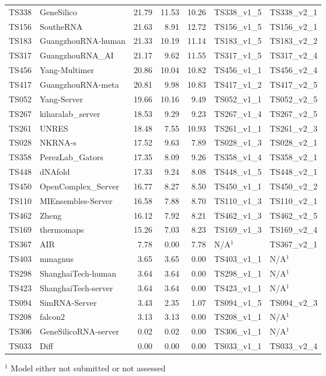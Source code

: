 \begin{table}[ht]
{\begin{tabular}{llrrrll}
TS338 & GeneSilico & 21.79 & 11.53 & 10.26 & TS338\_v1\_5 & TS338\_v2\_1 \\ 
TS156 & SoutheRNA & 21.63 & 8.91 & 12.72 & TS156\_v1\_5 & TS156\_v2\_1 \\ 
TS183 & GuangzhouRNA-human & 21.33 & 10.19 & 11.14 & TS183\_v1\_5 & TS183\_v2\_2 \\ 
TS317 & GuangzhouRNA\_AI & 21.17 & 9.62 & 11.55 & TS317\_v1\_5 & TS317\_v2\_4 \\ 
TS456 & Yang-Multimer & 20.86 & 10.04 & 10.82 & TS456\_v1\_1 & TS456\_v2\_4 \\ 
TS417 & GuangzhouRNA-meta & 20.81 & 9.98 & 10.83 & TS417\_v1\_2 & TS417\_v2\_5 \\ 
TS052 & Yang-Server & 19.66 & 10.16 & 9.49 & TS052\_v1\_1 & TS052\_v2\_5 \\ 
TS267 & kiharalab\_server & 18.53 & 9.29 & 9.23 & TS267\_v1\_4 & TS267\_v2\_5 \\ 
TS261 & UNRES & 18.48 & 7.55 & 10.93 & TS261\_v1\_1 & TS261\_v2\_3 \\ 
TS028 & NKRNA-s & 17.52 & 9.63 & 7.89 & TS028\_v1\_3 & TS028\_v2\_1 \\ 
TS358 & PerezLab\_Gators & 17.35 & 8.09 & 9.26 & TS358\_v1\_4 & TS358\_v2\_1 \\ 
TS448 & dNAfold & 17.33 & 9.24 & 8.08 & TS448\_v1\_5 & TS448\_v2\_1 \\ 
TS450 & OpenComplex\_Server & 16.77 & 8.27 & 8.50 & TS450\_v1\_1 & TS450\_v2\_2 \\ 
TS110 & MIEnsembles-Server & 16.58 & 7.88 & 8.70 & TS110\_v1\_3 & TS110\_v2\_1 \\ 
TS462 & Zheng & 16.12 & 7.92 & 8.21 & TS462\_v1\_3 & TS462\_v2\_5 \\ 
TS169 & thermomaps & 15.26 & 7.03 & 8.23 & TS169\_v1\_3 & TS169\_v2\_4 \\ 
TS367 & AIR & 7.78 & 0.00 & 7.78 & N/A$^{1}$ & TS367\_v2\_1 \\ 
TS403 & mmagnus & 3.65 & 3.65 & 0.00 & TS403\_v1\_1 & N/A$^{1}$ \\ 
TS298 & ShanghaiTech-human & 3.64 & 3.64 & 0.00 & TS298\_v1\_1 & N/A$^{1}$ \\ 
TS423 & ShanghaiTech-server & 3.64 & 3.64 & 0.00 & TS423\_v1\_1 & N/A$^{1}$ \\ 
TS094 & SimRNA-Server & 3.43 & 2.35 & 1.07 & TS094\_v1\_5 & TS094\_v2\_3 \\ 
TS208 & falcon2 & 3.13 & 3.13 & 0.00 & TS208\_v1\_1 & N/A$^{1}$ \\ 
TS306 & GeneSilicoRNA-server & 0.02 & 0.02 & 0.00 & TS306\_v1\_1 & N/A$^{1}$ \\ 
TS033 & Diff & 0.00 & 0.00 & 0.00 & TS033\_v1\_1 & TS033\_v2\_4 \\ 
\bottomrule
\end{tabular}%
}
\begin{flushleft}\footnotesize $^{1}$ Model either not submitted or not assessed\end{flushleft}
\end{table}

